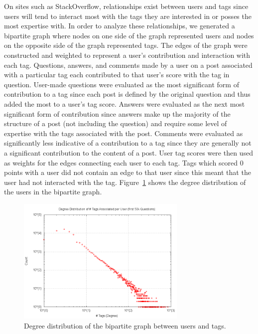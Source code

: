 \documentclass[10pt]{IEEEtran}
\begin{document}
On sites such as StackOverflow, relationships exist between users and tags since users will tend to interact most with the tags they are interested in or posses the most expertise with. In order to analyze these relationships, we generated a bipartite graph where nodes on one side of the graph represented users and nodes on the opposite side of the graph represented tags. The edges of the graph were constructed and weighted to represent a user’s contribution and interaction with each tag. Questions, answers, and comments made by a user on a post associated with a particular tag each contributed to that user’s score with the tag in question. User-made questions were evaluated as the most significant form of contribution to a tag since each post is defined by the original question and thus added the most to a user’s tag score. Answers were evaluated as the next most significant form of contribution since answers make up the majority of the structure of a post (not including the question) and require some level of expertise with the tags associated with the post. Comments were evaluated as significantly less indicative of a contribution to a tag since they are generally not a significant contribution to the content of a post. User tag scores were then used as weights for the edges connecting each user to each tag. Tags which scored $0$ points with a user did not contain an edge to that user since this meant that the user had not interacted with the tag. Figure~\ref{fig:bi_dd} shows the degree distribution of the users in the bipartite graph.

\begin{figure}[h]
  \centering
    \includegraphics[width=3.2in]{bipartite_degdistr.png}
  \caption{Degree distribution of the bipartite graph between users and tags.}
  \label{fig:bi_dd}
\end{figure}
\end{document}
